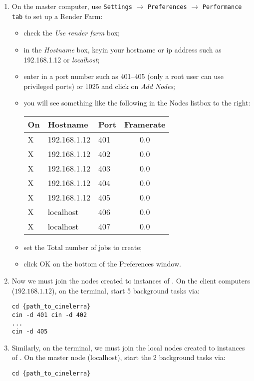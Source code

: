 \begin{enumerate}
\item On the master computer, use \texttt{Settings} $\rightarrow$
  \texttt{Preferences} $\rightarrow$ \texttt{Performance} \texttt{tab}
  to set up a Render Farm:
  \begin{itemize}
  \item check the \textit{Use render farm} box;
  \item in the \textit{Hostname} box, keyin your hostname or ip
    address such as 192.168.1.12 or \textit{localhost};
  \item enter in a port number such as 401--405 (only a root user
    can use privileged ports) or $1025$ and click on \textit{Add Nodes};
  \item you will see something like the following in the Nodes
    listbox to the right:\newline
    \begin{tabular}{lllc} On & Hostname & Port & Framerate
      \\\midrule
      X & 192.168.1.12 & 401 & 0.0 \\
      X & 192.168.1.12 & 402 & 0.0 \\
      X & 192.168.1.12 & 403 & 0.0 \\
      X & 192.168.1.12 & 404 & 0.0 \\
      X & 192.168.1.12 & 405 & 0.0 \\
      X & localhost & 406 & 0.0 \\
      X & localhost & 407 & 0.0 \\
    \end{tabular}
  \item set the Total number of jobs to create;
  \item click OK on the bottom of the Preferences window.
  \end{itemize}
\item Now we must join the nodes created to instances of \CGG{}. On the client computers ($192.168.1.12$), on the terminal, start 5 background  \CGG{} tasks via:
\begin{lstlisting}[style=sh]
cd {path_to_cinelerra}
cin -d 401 cin -d 402
...
cin -d 405
\end{lstlisting}
\item Similarly, on the terminal, we must join the local nodes created to instances of \CGG{}. On the master node (localhost), start the 2 background \CGG{}  tasks via:
\begin{lstlisting}[style=sh]
cd {path_to_cinelerra}

\end{lstlisting}
\end{enumerate}
